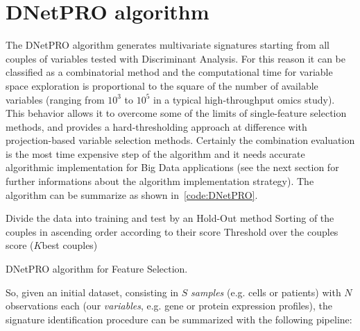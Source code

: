 \documentclass{standalone}
\begin{document}
\section[DNetPRO algorithm]{DNetPRO algorithm}\label{dnetpro:DNetPRO}

The DNetPRO algorithm generates multivariate signatures starting from all couples of variables tested with Discriminant Analysis.
For this reason it can be classified as a combinatorial method and the computational time for variable space exploration is proportional to the square of the number of available variables (ranging from $10^3$ to $10^5$ in a typical high-throughput omics study).
This behavior allows it to overcome some of the limits of single-feature selection methods, and provides a hard-thresholding approach at difference with projection-based variable selection methods.
Certainly the combination evaluation is the most time expensive step of the algorithm and it needs accurate algorithmic implementation for Big Data applications (see the next section for further informations about the algorithm implementation strategy).
The algorithm can be summarize as shown in~\ref{code:DNetPRO}.

\begin{algorithm}[H]
  Divide the data into training and test by an Hold-Out method\;
  Sorting of the couples in ascending order according to their score\;
  Threshold over the couples score ($K$best couples)\;
  \caption{DNetPRO algorithm for Feature Selection.}
  \label{code:DNetPRO}
\end{algorithm}

So, given an initial dataset, consisting in $S$ \emph{samples} (e.g. cells or patients) with $N$ observations each (our \emph{variables}, e.g. gene or protein expression profiles), the signature identification procedure can be summarized with the following pipeline:
\end{document}
